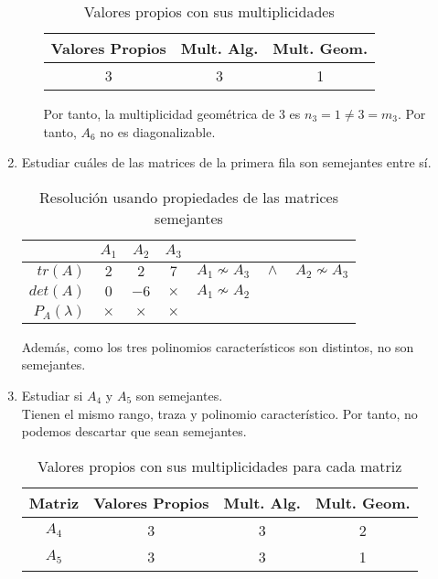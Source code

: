 \begin{ejercicio}
\begin{enumerate}
\begin{enumerate}
            \begin{table}[H]
                \centering
                \begin{tabular}{c|c|c}
                    Valores Propios & Mult. Alg. & Mult. Geom. \\ \hline 
                    3 & 3 & 1\\
                \end{tabular}
                \caption{Valores propios con sus multiplicidades}
            \end{table}

            Por tanto, la multiplicidad geométrica de $3$ es $n_3=1 \neq 3 = m_3$. Por tanto, $A_6$ no es diagonalizable.

        \end{enumerate}
        

         

        \item Estudiar cuáles de las matrices de la primera fila son semejantes entre sí.
        \begin{table}[H]
            \centering
            \begin{tabular}{r|ccc|l}
                 & $A_1$ & $A_2$ & $A_3$ & \\ \hline
                 $tr(A)$ & $2$ & $2$ & $7$ & $A_1 \nsim A_3 \quad \land \quad A_2 \nsim A_3$ \\
                 $det(A)$ & $0$ & $-6$ & $\times$ & $A_1 \nsim A_2$\\
                 $P_A(\lambda)$ & $\times$ & $\times$ & $\times$ &
            \end{tabular}
            \caption{Resolución usando propiedades de las matrices semejantes}
        \end{table}
        Además, como los tres polinomios característicos son distintos, no son semejantes.

        \item Estudiar si $A_4$ y $A_5$ son semejantes.\\
        
        Tienen el mismo rango, traza y polinomio característico. Por tanto, no podemos descartar que sean semejantes.

        \begin{table}[H]
            \centering
            \begin{tabular}{c|c|c|c}
                Matriz & Valores Propios & Mult. Alg. & Mult. Geom. \\ \hline 
                $A_4$ & 3 & 3 & 2\\
                $A_5$ & 3 & 3 & 1\\
            \end{tabular}
            \caption{Valores propios con sus multiplicidades para cada matriz}
        \end{table}
    

\end{enumerate}
\end{ejercicio}
